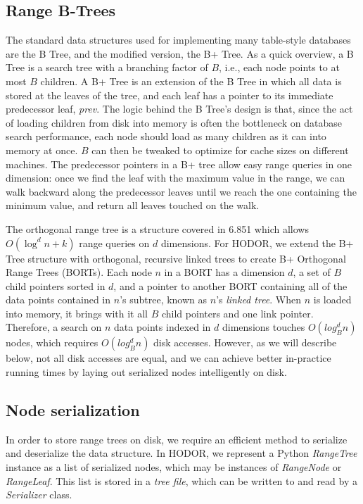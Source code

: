 \documentclass[11pt, oneside]{article}
\newcommand{\ms}{\textit}
\begin{document}
\subsection{Range B-Trees}

The standard data structures used for implementing many table-style databases
are the B Tree, and the modified version, the B+ Tree. As a quick overview, a B Tree is a
search tree with a branching factor of $B$, i.e., each node points to at most
$B$ children. A B+ Tree is an extension of the B Tree in which all data is stored at the
leaves of the tree, and each leaf has a pointer to its immediate predecessor
leaf, \ms{prev}. The logic behind the B Tree's design is that, since the act of
loading children from disk into memory is often the bottleneck on database
search performance, each node should load as many children as it can into memory
at once. $B$ can then be tweaked to optimize for cache sizes on different machines.
The predecessor pointers in a B+ tree allow easy range queries in one
dimension: once we find the leaf with the maximum value in the range, we can
walk backward along the predecessor leaves until we reach the one containing the
minimum value, and return all leaves touched on the walk.

The orthogonal range tree is a structure covered in 6.851 which allows
$O(\log^d n + k)$ range queries on $d$ dimensions. For HODOR, we extend the B+
Tree structure with orthogonal, recursive linked trees to create B+ Orthogonal
Range Trees (BORTs). Each node $n$ in a BORT has a dimension $d$, a set of $B$
child pointers sorted in $d$, and a pointer to another BORT containing all of
the data points contained in $n$'s subtree, known as $n$'s \textit{linked
tree}. When $n$ is loaded into memory, it brings with it all $B$ child pointers
and one link pointer. Therefore, a search on $n$ data points indexed in $d$
dimensions touches $O(log^d_B n)$ nodes, which requires $O(log^d_B n)$ disk
accesses.  However, as we will describe below, not all disk accesses are equal,
and we can achieve better in-practice running times by laying out serialized
nodes intelligently on disk.

\subsection{Node serialization}

In order to store range trees on disk, we require an efficient method to
serialize and deserialize the data structure. In HODOR, we represent a Python
\ms{RangeTree} instance as a list of serialized nodes, which may be instances of
\ms{RangeNode} or \ms{RangeLeaf}. This list is stored in a \textit{tree file}, which
can be written to and read by a \ms{Serializer} class. 
\end{document}
